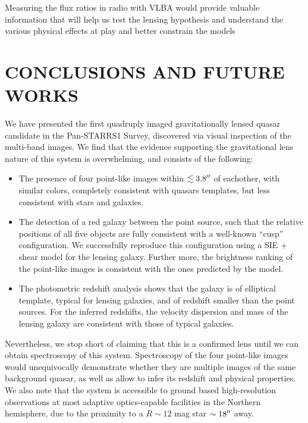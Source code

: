 \documentclass[manuscript]{aastex}
\begin{document}
Measuring the flux ratios in radio with VLBA would provide valuable information that will help us test the lensing hypothesis and understand the various physical effects at play and better constrain the models 


\section{CONCLUSIONS AND FUTURE WORKS}

We have presented the first quadruply imaged gravitationally lensed quasar candidate in the Pan-STARRS1 Survey, discovered via visual inspection of the multi-band images. We find that the evidence supporting the gravitational lens nature of this system is overwhelming, and consists of the following:

\begin{itemize}
\item The presence of four point-like images within $\lesssim 3.8\mbox{$^{\prime\prime}$}$ of eachother, with similar colors, completely consistent with quasars templates, but less consistent with stars and galaxies.
\item The detection of a red galaxy between the point source, such that the relative positions of all five objects are fully consistent with a well-known ``cusp'' configuration. We successfully reproduce this configuration using a SIE + shear model for the lensing galaxy. Further more, the brightness ranking of the point-like images is consistent with the ones predicted by the model.
 \item The photometric redshift analysis shows that the galaxy is of elliptical template, typical for lensing galaxies, and of redshift smaller than the point sources. For the inferred redshifts, the velocity dispersion and mass of the lensing galaxy are consistent with those of typical galaxies.
\end{itemize}

Nevertheless, we stop short of claiming that this is a confirmed lens until we can obtain spectroscopy of this system. Spectroscopy of the four point-like images would unequivocally demonstrate whether they are multiple images of the same background quasar, as well as allow to infer its redshift and physical properties. We also note that the system is accessible to ground based high-resolution observations at most adaptive optics-capable facilities in the Northern hemisphere, due to the proximity to a $R\sim12$ mag star $\sim18\mbox{$^{\prime\prime}$}$ away.
\end{document}
